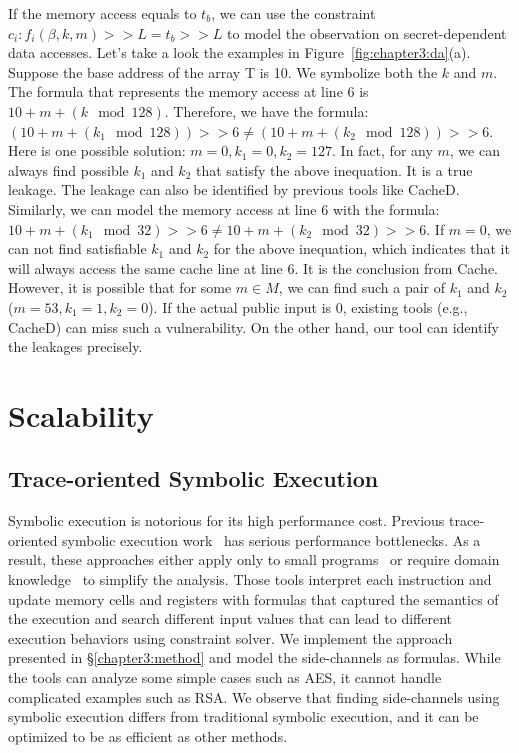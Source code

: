 If the memory access equals to $t_b$, we can use the constraint $c_i :
f_i(\beta, k, m) >> L = t_b >> L$ to model the observation on secret-dependent
data accesses. Let's take a look the examples in Figure~\ref{fig:chapter3:da}(a). 
Suppose the base address of the array \textsf{T} is 10. We symbolize both the $k$ and $m$. The formula that represents the memory access at line 6 is $10 + m + (k \mod 128)$. Therefore, we have the formula: $(10 + m + (k_1 \mod 128)) >> 6  \neq (10 + m + (k_2 \mod 128)) >> 6$.
Here is one possible solution: $m = 0, k_1 = 0, k_2 = 127$. In fact, for any $m$, we can always find possible $k_1$ and $k_2$ that satisfy the above inequation. It is a true leakage. The leakage can also be identified by previous tools like CacheD. Similarly, we can model the memory access at line 6 with the formula:  $10 + m + (k_1 \mod 32) >> 6  \neq 10 + m + (k_2 \mod 32) >> 6$. If $m = 0$, we can not find satisfiable $k_1$ and $k_2$ for the above inequation, which indicates that it will always access the same cache line at line 6. It is the conclusion from Cache. However, it is possible that for some $m \in M$, we can find such a pair of $k_1$ and $k_2$ ($m = 53, k_1 = 1, k_2 = 0$). If the actual public input is $0$, existing tools (e.g., CacheD) can miss such a vulnerability. On the other hand, our tool can identify the leakages precisely.

\section{Scalability}
\subsection{Trace-oriented Symbolic Execution}
Symbolic execution is notorious for its high performance cost. 
Previous trace-oriented symbolic execution
work~\cite{203878,Chattopadhyay:2017:QIL:3127041.3127044} has serious
performance bottlenecks. As a result, these approaches either apply only to
small programs~\cite{Chattopadhyay:2017:QIL:3127041.3127044} or require
domain knowledge~\cite{Wang:2007:NCD:1250662.1250723} to simplify the analysis. 
Those tools interpret each
instruction and update memory cells and registers with formulas that
captured the semantics of the execution and search different input values that
can lead to different execution behaviors using constraint solver. 
We implement the approach presented in \S\ref{chapter3:method} and model the side-channels as formulas. While the tools can analyze some simple cases such as AES, it cannot handle complicated examples such as RSA.
We observe that finding side-channels using symbolic execution differs from
traditional symbolic execution, and it can be optimized to be as efficient
as other methods.

